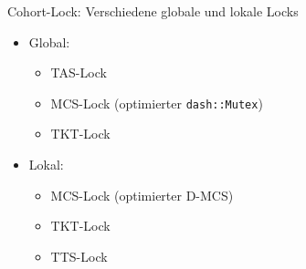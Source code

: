 \documentclass[fleqn,compress,utf8,aspectratio=169,t]{beamer}
\begin{document}
\begin{frame}{Cohort-Lock: Verschiedene globale und lokale Locks}
    \begin{itemize}
        \item Global:
              \begin{itemize}
                  \item TAS-Lock
                  \item MCS-Lock (optimierter \texttt{dash::Mutex})
                  \item TKT-Lock \cite{TKT-Lock}
              \end{itemize}
        \item Lokal:
              \begin{itemize}
                  \item MCS-Lock (optimierter D-MCS)
                  \item TKT-Lock \cite{TKT-Lock}
                  \item TTS-Lock
              \end{itemize}
    \end{itemize}
\end{frame}
\end{document}
